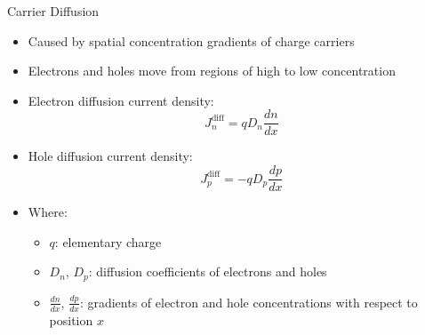 \begin{frame}{Carrier Diffusion}
    \begin{itemize}
        \item Caused by spatial concentration gradients of charge carriers
        \item Electrons and holes move from regions of high to low concentration
        \item Electron diffusion current density:
        \begin{equation}
        J_n^{\text{diff}} = q D_n \frac{dn}{dx}
        \end{equation}
        \item Hole diffusion current density:
        \begin{equation}
        J_p^{\text{diff}} = -q D_p \frac{dp}{dx}
        \end{equation}
        \item Where:
        \begin{itemize}
            \item $q$: elementary charge
            \item $D_n$, $D_p$: diffusion coefficients of electrons and holes
            \item $\frac{dn}{dx}$, $\frac{dp}{dx}$: gradients of electron and hole concentrations with respect to position $x$
        \end{itemize}
    \end{itemize}
\end{frame}

